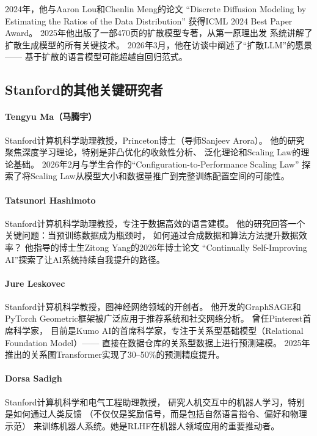 2024年，他与Aaron Lou和Chenlin Meng的论文
``Discrete Diffusion Modeling by Estimating the Ratios of the Data Distribution''
获得ICML 2024 Best Paper Award。
2025年他出版了一部470页的扩散模型专著，从第一原理出发
系统讲解了扩散生成模型的所有关键技术。
2026年3月，他在访谈中阐述了``扩散LLM''的愿景——
基于扩散的语言模型可能超越自回归范式。

\subsection{Stanford的其他关键研究者}

\paragraph{Tengyu Ma（马腾宇）}
Stanford计算机科学助理教授，Princeton博士（导师Sanjeev Arora）。
他的研究聚焦深度学习理论，特别是非凸优化的收敛性分析、
泛化理论和Scaling Law的理论基础。
2026年2月与学生合作的``Configuration-to-Performance Scaling Law''
探索了将Scaling Law从模型大小和数据量推广到完整训练配置空间的可能性。

\paragraph{Tatsunori Hashimoto}
Stanford计算机科学助理教授，专注于数据高效的语言建模。
他的研究回答一个关键问题：当预训练数据成为瓶颈时，
如何通过合成数据和算法方法提升数据效率？
他指导的博士生Zitong Yang的2026年博士论文
``Continually Self-Improving AI''探索了让AI系统持续自我提升的路径。

\paragraph{Jure Leskovec}
Stanford计算机科学教授，图神经网络领域的开创者。
他开发的GraphSAGE和PyTorch Geometric框架被广泛应用于推荐系统和社交网络分析。
曾任Pinterest首席科学家，
目前是Kumo AI的首席科学家，专注于关系型基础模型（Relational Foundation Model）——
直接在数据仓库的关系型数据上进行预测建模。
2025年推出的关系图Transformer实现了30--50\%的预测精度提升。

\paragraph{Dorsa Sadigh}
Stanford计算机科学和电气工程助理教授，
研究人机交互中的机器人学习，特别是如何通过人类反馈
（不仅仅是奖励信号，而是包括自然语言指令、偏好和物理示范）
来训练机器人系统。她是RLHF在机器人领域应用的重要推动者。



